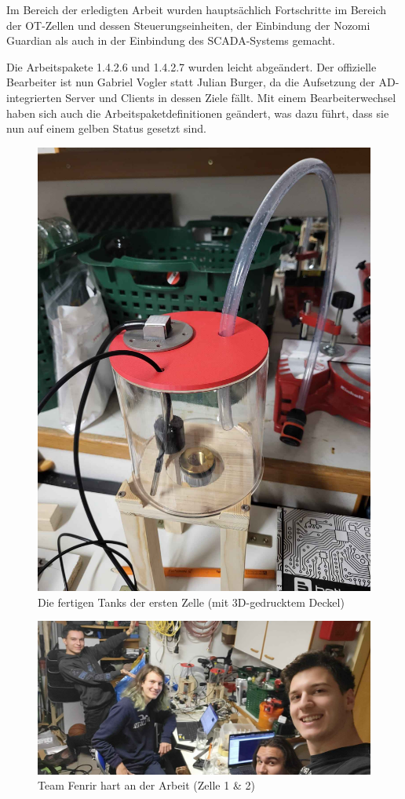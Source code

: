 \documentclass[
	headings=optiontotocandhead,%
	oneside,
	numbers=noenddot,%
	toc=flat, %
	10pt, %
	parskip=full, %
	listof=totoc, %
	listof=flat, %
	numbers=noenddot, %
	bibliography=totoc, %
	a4paper,DIV=14,
]{scrartcl}
\begin{document}
\FloatBarrier 

Im Bereich der erledigten Arbeit wurden hauptsächlich Fortschritte im Bereich der OT-Zellen und dessen Steuerungseinheiten, der Einbindung der Nozomi Guardian als auch in der Einbindung des SCADA-Systems gemacht.

Die Arbeitspakete 1.4.2.6 und 1.4.2.7 wurden leicht abgeändert. Der offizielle Bearbeiter ist nun Gabriel Vogler statt Julian Burger, da die Aufsetzung der AD-integrierten Server und Clients in dessen Ziele fällt. Mit einem Bearbeiterwechsel haben sich auch die Arbeitspaketdefinitionen geändert, was dazu führt, dass sie nun auf einem gelben Status gesetzt sind.

\begin{figure}[h]
	\centering
	\includegraphics[width=0.9\linewidth]{20241112_1}
	\caption[]{Die fertigen Tanks der ersten Zelle (mit 3D-gedrucktem Deckel)}
\end{figure}
\FloatBarrier 

\begin{figure}[h]
	\centering
	\includegraphics[width=0.9\linewidth]{20241112_2}
	\caption[]{Team Fenrir hart an der Arbeit (Zelle 1 \& 2)}
\end{figure}
\FloatBarrier 
\end{document}
